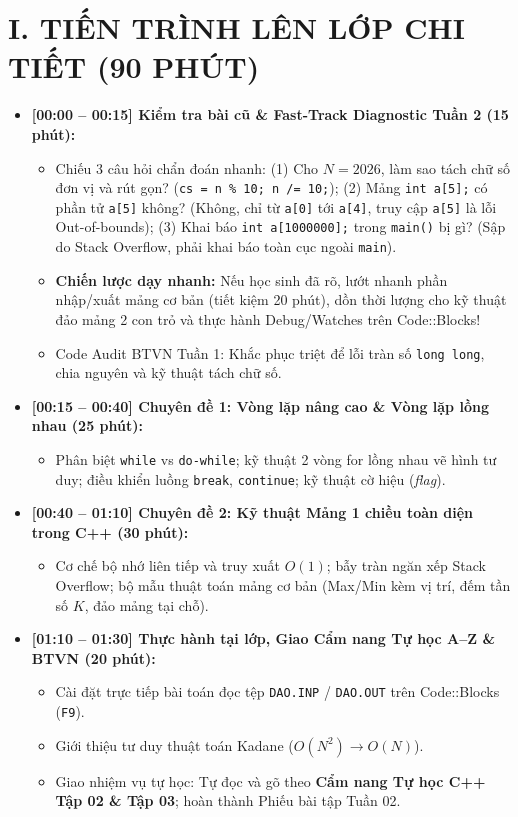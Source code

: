 \documentclass[11pt,a4paper]{article}
\begin{document}
\section*{\color{AsianDarkBlue}I. TIẾN TRÌNH LÊN LỚP CHI TIẾT (90 PHÚT)}
\begin{itemize}
    \setlength{\itemsep}{2pt}
    \item \textbf{[00:00 -- 00:15] Kiểm tra bài cũ \& Fast-Track Diagnostic Tuần 2 (15 phút):}
    \begin{itemize}
        \item Chiếu 3 câu hỏi chẩn đoán nhanh: (1) Cho $N = 2026$, làm sao tách chữ số đơn vị và rút gọn? (\texttt{cs = n \% 10; n /= 10;}); (2) Mảng \texttt{int a[5];} có phần tử \texttt{a[5]} không? (Không, chỉ từ \texttt{a[0]} tới \texttt{a[4]}, truy cập \texttt{a[5]} là lỗi Out-of-bounds); (3) Khai báo \texttt{int a[1000000];} trong \texttt{main()} bị gì? (Sập do Stack Overflow, phải khai báo toàn cục ngoài \texttt{main}).
        \item \textbf{Chiến lược dạy nhanh:} Nếu học sinh đã rõ, lướt nhanh phần nhập/xuất mảng cơ bản (tiết kiệm 20 phút), dồn thời lượng cho kỹ thuật đảo mảng 2 con trỏ và thực hành Debug/Watches trên Code::Blocks!
        \item Code Audit BTVN Tuần 1: Khắc phục triệt để lỗi tràn số \texttt{long long}, chia nguyên và kỹ thuật tách chữ số.
    \end{itemize}
    \item \textbf{[00:15 -- 00:40] Chuyên đề 1: Vòng lặp nâng cao \& Vòng lặp lồng nhau (25 phút):}
    \begin{itemize}
        \item Phân biệt \texttt{while} vs \texttt{do-while}; kỹ thuật 2 vòng for lồng nhau vẽ hình tư duy; điều khiển luồng \texttt{break}, \texttt{continue}; kỹ thuật cờ hiệu (\textit{flag}).
    \end{itemize}
    \item \textbf{[00:40 -- 01:10] Chuyên đề 2: Kỹ thuật Mảng 1 chiều toàn diện trong C++ (30 phút):}
    \begin{itemize}
        \item Cơ chế bộ nhớ liên tiếp và truy xuất $O(1)$; bẫy tràn ngăn xếp Stack Overflow; bộ mẫu thuật toán mảng cơ bản (Max/Min kèm vị trí, đếm tần số $K$, đảo mảng tại chỗ).
    \end{itemize}
    \item \textbf{[01:10 -- 01:30] Thực hành tại lớp, Giao Cẩm nang Tự học A--Z \& BTVN (20 phút):}
    \begin{itemize}
        \item Cài đặt trực tiếp bài toán đọc tệp \texttt{DAO.INP} / \texttt{DAO.OUT} trên Code::Blocks (\texttt{F9}).
        \item Giới thiệu tư duy thuật toán Kadane ($O(N^2) \to O(N)$).
        \item Giao nhiệm vụ tự học: Tự đọc và gõ theo \textbf{Cẩm nang Tự học C++ Tập 02 \& Tập 03}; hoàn thành Phiếu bài tập Tuần 02.
    \end{itemize}
\end{itemize}
\end{document}
